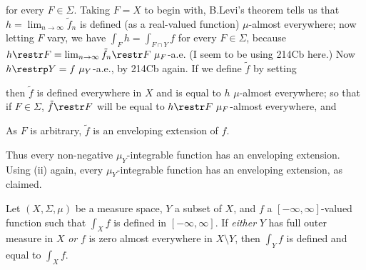 {\noindent for every $F\in\Sigma$.   Taking $F=X$ to begin with, B.Levi's
theorem tells us that $h=\lim_{n\to\infty}\tilde f_n$ is defined (as a
real-valued function) $\mu$-almost everywhere;  now letting $F$ vary, we
have $\int_Fh=\int_{F\cap Y}f$ for every $F\in\Sigma$, because
$h\restr F=\lim_{n\to\infty}\tilde f_n\restr F\,\,\mu_F$-a.e.   (I seem
to be using 214Cb here.)   Now $h\restrp Y=f\,\,\mu_Y$-a.e., by 214Cb
again.   If we define $\tilde f$ by setting


\noindent then $\tilde f$ is defined everywhere in $X$ and is equal to
$h\,\,\mu$-almost everywhere;  so that if $F\in\Sigma$,
$\tilde f\restr F$ will be equal to $h\restr F\,\,\mu_F$-almost
everywhere, and


\noindent As $F$ is arbitrary, $\tilde f$ is an enveloping
extension of $f$.

\medskip

 Thus every non-negative $\mu_Y$-integrable function has
an enveloping extension.   Using (ii) again, every $\mu_Y$-integrable
function has an enveloping extension, as claimed.
}%

 Let $(X,\Sigma,\mu)$ be a measure space, $Y$
a subset of $X$, and $f$ a $[-\infty,\infty]$-valued function such that
$\int_Xf$ is defined in $[-\infty,\infty]$.   If {\it either} $Y$ has
full outer measure in $X$ {\it or} $f$ is zero almost everywhere in
$X\setminus Y$, then $\int_Yf$ is defined and equal to $\int_Xf$.


